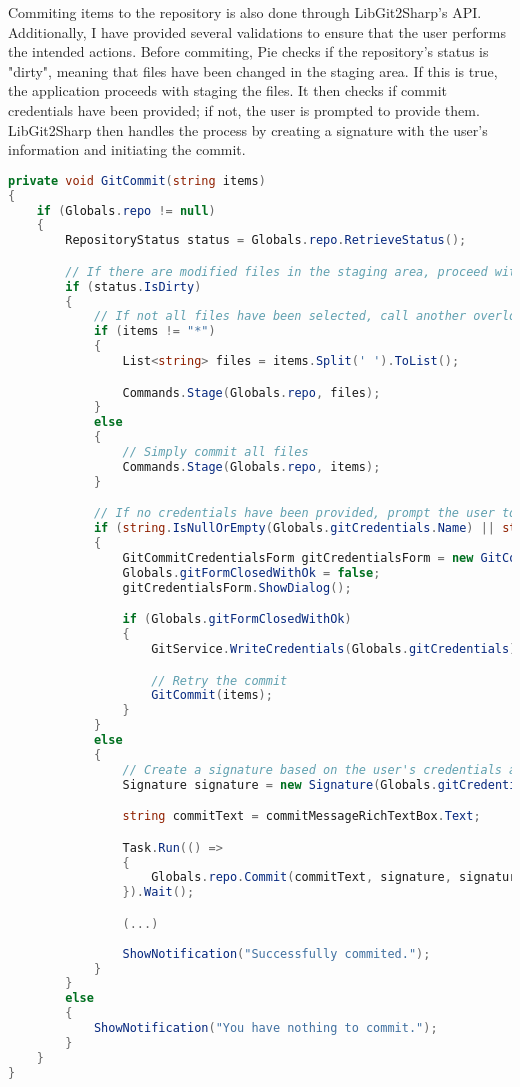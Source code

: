 Commiting items to the repository is also done through LibGit2Sharp's API. Additionally, I have provided several validations to ensure that the user performs the intended actions. Before commiting, Pie checks if the repository's status is "dirty", meaning that files have been changed in the staging area. If this is true, the application proceeds with staging the files. It then checks if commit credentials have been provided; if not, the user is prompted to provide them. LibGit2Sharp then handles the process by creating a signature with the user's information and initiating the commit.

\begin{lstlisting}[language=csharp, caption={Commiting to a repository using LibGit2Sharp}]
private void GitCommit(string items)
{
    if (Globals.repo != null)
    {
        RepositoryStatus status = Globals.repo.RetrieveStatus();

        // If there are modified files in the staging area, proceed with the commit
        if (status.IsDirty)
        {
            // If not all files have been selected, call another overloaded version of Stage()
            if (items != "*")
            {
                List<string> files = items.Split(' ').ToList();

                Commands.Stage(Globals.repo, files);
            }
            else
            {
                // Simply commit all files
                Commands.Stage(Globals.repo, items);
            }

            // If no credentials have been provided, prompt the user to type in their name and email address
            if (string.IsNullOrEmpty(Globals.gitCredentials.Name) || string.IsNullOrEmpty(Globals.gitCredentials.Email))
            {
                GitCommitCredentialsForm gitCredentialsForm = new GitCommitCredentialsForm();
                Globals.gitFormClosedWithOk = false;
                gitCredentialsForm.ShowDialog();

                if (Globals.gitFormClosedWithOk)
                {
                    GitService.WriteCredentials(Globals.gitCredentials);

                    // Retry the commit
                    GitCommit(items);
                }
            }
            else
            {
                // Create a signature based on the user's credentials and run the commit
                Signature signature = new Signature(Globals.gitCredentials.Name, Globals.gitCredentials.Email, DateTime.Now);

                string commitText = commitMessageRichTextBox.Text;

                Task.Run(() =>
                {
                    Globals.repo.Commit(commitText, signature, signature);
                }).Wait();

                (...)
                
                ShowNotification("Successfully commited.");
            }
        }
        else
        {
            ShowNotification("You have nothing to commit.");
        }
    }
}
\end{lstlisting}

